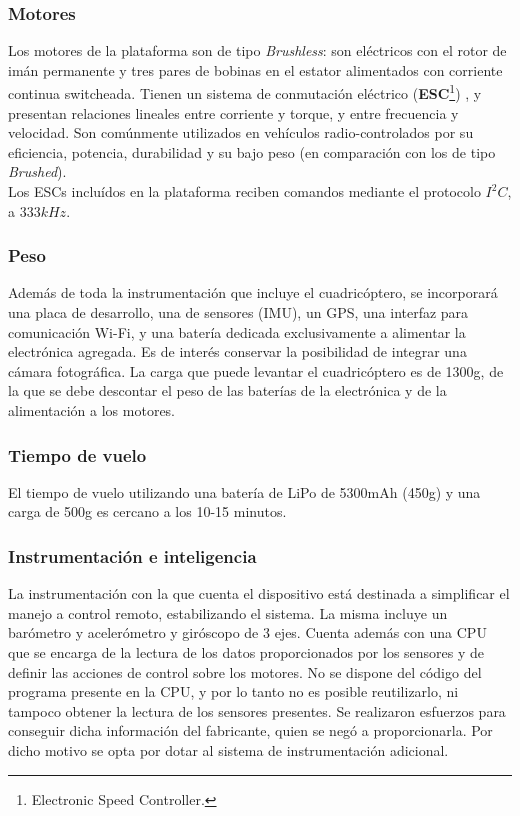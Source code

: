 \documentclass[main]{subfiles}
\begin{document}
\subsubsection*{Motores}
Los motores de la plataforma son de tipo \emph{Brushless}: son el\'ectricos con el rotor de im\'an permanente y tres pares de bobinas en el estator alimentados con corriente continua switcheada. Tienen un sistema de conmutaci\'on el\'ectrico (\textbf{ESC}\footnote{Electronic Speed Controller.}) , y presentan relaciones lineales entre corriente y torque, y entre frecuencia y velocidad. Son com\'unmente utilizados en veh\'iculos radio-controlados por su eficiencia, potencia, durabilidad y su bajo peso (en comparaci\'on con los de tipo \emph{Brushed}).\\ 

Los ESCs inclu\'idos en la plataforma reciben comandos mediante el protocolo $I^2C$, a $333kHz$.  

\subsubsection*{Peso}

Adem\'as de toda la instrumentaci\'on que incluye el cuadric\'optero, se incorporar\'a una placa de desarrollo, una de sensores (IMU), un GPS, una interfaz para comunicaci\'on Wi-Fi, y una bater\'ia dedicada exclusivamente a alimentar la electr\'onica agregada. Es de inter\'es conservar la posibilidad de integrar una c\'amara fotogr\'afica. La carga que puede levantar el cuadric\'optero es de 1300g, de la que se debe descontar el peso de las bater\'ias de la electr\'onica y de la alimentaci\'on a los motores.

\subsubsection*{Tiempo de vuelo}

El tiempo de vuelo utilizando una bater\'ia de LiPo de 5300mAh (450g) y una carga de 500g es cercano a los 10-15 minutos.

\subsubsection*{Instrumentaci\'on e inteligencia}

	La instrumentaci\'on con la que cuenta el dispositivo est\'a destinada a simplificar el manejo a control remoto, estabilizando el sistema. La misma incluye un bar\'ometro y aceler\'ometro y gir\'oscopo de 3 ejes. Cuenta adem\'as con una CPU que se encarga de la lectura de los datos proporcionados por los sensores y de definir las acciones de control sobre los motores. No se dispone del c\'odigo del programa presente en la CPU, y por lo tanto no es posible reutilizarlo, ni tampoco obtener la lectura de los sensores presentes. Se realizaron esfuerzos para conseguir dicha informaci\'on del fabricante, quien se neg\'o a proporcionarla. Por dicho motivo se opta por dotar al sistema de instrumentaci\'on adicional. 
\end{document}

